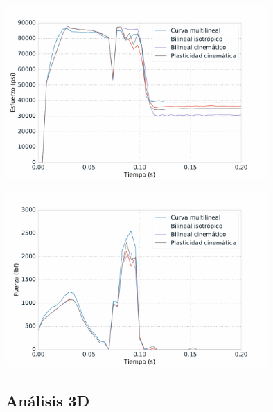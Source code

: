 \begin{center}
\includegraphics[width=0.75\textwidth]{src/ch4/mdm_von_mises.pdf}
\label{fig:mdm_von_mises}
\end{center}

\begin{center}
\includegraphics[width=0.75\textwidth]{src/ch4/mdm_force.pdf}
\label{fig:mdm_force}
\end{center}

\subsection{Análisis 3D}




